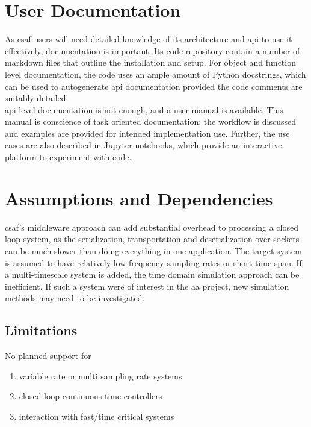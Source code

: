 \section{User Documentation}

As \acrshort{csaf} users will need detailed knowledge of its architecture and \acrshort{api} to use it 
effectively, documentation is important. Its code repository contain a number of markdown files that outline 
the installation and setup. For object and function level documentation, the code uses an ample amount of 
Python docstrings, which can be used to autogenerate \acrshort{api} documentation provided the code 
comments are suitably detailed. \\

\acrshort{api} level documentation is not enough, and a user manual is available. This manual is conscience 
of task oriented documentation; the workflow is discussed and examples are provided for intended 
implementation use. Further, the use cases are also described in Jupyter notebooks, which provide an 
interactive platform to experiment with code.

\section{Assumptions and Dependencies}

\acrshort{csaf}'s middleware approach can add substantial overhead to processing a closed loop system, as 
the serialization, transportation and deserialization over sockets can be much slower than doing everything in 
one application. The target system is assumed to have relatively low frequency sampling rates or short time 
span. If a multi-timescale system is added, the time domain simulation approach can be inefficient. If such a 
system were of interest in the \acrshort{aa} project, new simulation methods may need to be investigated.\\

\subsection{Limitations}

No planned support for
\begin{enumerate}
\item  variable rate or multi sampling rate systems
\item closed loop continuous time controllers
\item interaction with fast/time critical systems
\end{enumerate}
